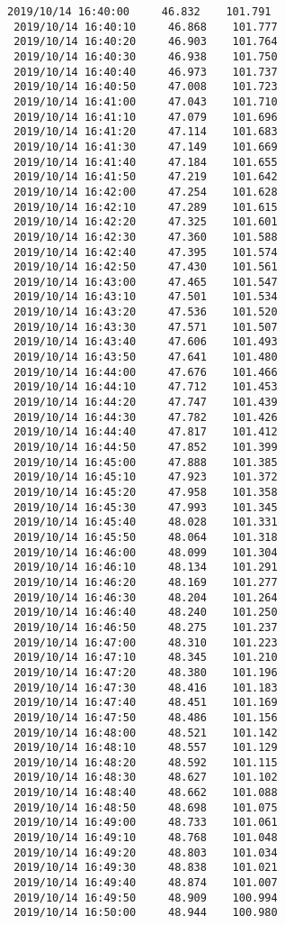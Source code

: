 \documentclass[11pt]{article}
\begin{document}
\begin{Verbatim}[commandchars=\\\{\}]
 2019/10/14 16:40:00     46.832    101.791
 2019/10/14 16:40:10     46.868    101.777
 2019/10/14 16:40:20     46.903    101.764
 2019/10/14 16:40:30     46.938    101.750
 2019/10/14 16:40:40     46.973    101.737
 2019/10/14 16:40:50     47.008    101.723
 2019/10/14 16:41:00     47.043    101.710
 2019/10/14 16:41:10     47.079    101.696
 2019/10/14 16:41:20     47.114    101.683
 2019/10/14 16:41:30     47.149    101.669
 2019/10/14 16:41:40     47.184    101.655
 2019/10/14 16:41:50     47.219    101.642
 2019/10/14 16:42:00     47.254    101.628
 2019/10/14 16:42:10     47.289    101.615
 2019/10/14 16:42:20     47.325    101.601
 2019/10/14 16:42:30     47.360    101.588
 2019/10/14 16:42:40     47.395    101.574
 2019/10/14 16:42:50     47.430    101.561
 2019/10/14 16:43:00     47.465    101.547
 2019/10/14 16:43:10     47.501    101.534
 2019/10/14 16:43:20     47.536    101.520
 2019/10/14 16:43:30     47.571    101.507
 2019/10/14 16:43:40     47.606    101.493
 2019/10/14 16:43:50     47.641    101.480
 2019/10/14 16:44:00     47.676    101.466
 2019/10/14 16:44:10     47.712    101.453
 2019/10/14 16:44:20     47.747    101.439
 2019/10/14 16:44:30     47.782    101.426
 2019/10/14 16:44:40     47.817    101.412
 2019/10/14 16:44:50     47.852    101.399
 2019/10/14 16:45:00     47.888    101.385
 2019/10/14 16:45:10     47.923    101.372
 2019/10/14 16:45:20     47.958    101.358
 2019/10/14 16:45:30     47.993    101.345
 2019/10/14 16:45:40     48.028    101.331
 2019/10/14 16:45:50     48.064    101.318
 2019/10/14 16:46:00     48.099    101.304
 2019/10/14 16:46:10     48.134    101.291
 2019/10/14 16:46:20     48.169    101.277
 2019/10/14 16:46:30     48.204    101.264
 2019/10/14 16:46:40     48.240    101.250
 2019/10/14 16:46:50     48.275    101.237
 2019/10/14 16:47:00     48.310    101.223
 2019/10/14 16:47:10     48.345    101.210
 2019/10/14 16:47:20     48.380    101.196
 2019/10/14 16:47:30     48.416    101.183
 2019/10/14 16:47:40     48.451    101.169
 2019/10/14 16:47:50     48.486    101.156
 2019/10/14 16:48:00     48.521    101.142
 2019/10/14 16:48:10     48.557    101.129
 2019/10/14 16:48:20     48.592    101.115
 2019/10/14 16:48:30     48.627    101.102
 2019/10/14 16:48:40     48.662    101.088
 2019/10/14 16:48:50     48.698    101.075
 2019/10/14 16:49:00     48.733    101.061
 2019/10/14 16:49:10     48.768    101.048
 2019/10/14 16:49:20     48.803    101.034
 2019/10/14 16:49:30     48.838    101.021
 2019/10/14 16:49:40     48.874    101.007
 2019/10/14 16:49:50     48.909    100.994
 2019/10/14 16:50:00     48.944    100.980

\end{Verbatim}
\end{document}

